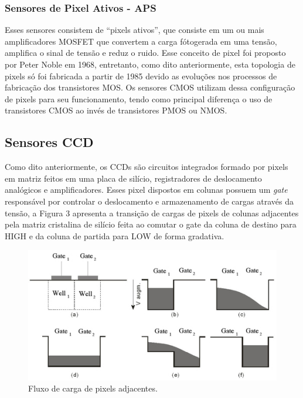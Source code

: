 \documentclass[10pt,a4paper,twocolumn]{article}
\begin{document}
	\subsubsection*{Sensores de Pixel Ativos - APS}
		Esses sensores consistem de ``pixels ativos'', que consiste em um ou mais amplificadores MOSFET que convertem a carga fótogerada em uma tensão, amplifica o sinal de tensão e reduz o ruido. Esse conceito de pixel foi proposto por Peter Noble em 1968, entretanto, como dito anteriormente, esta topologia de pixels só foi fabricada a partir de 1985 devido as evoluções nos processos de fabricação dos transistores MOS.  Os sensores CMOS utilizam dessa configuração de pixels para seu funcionamento, tendo como principal diferença o uso de transistores CMOS ao invés de transistores PMOS ou NMOS.
	
	\subsection*{Sensores CCD}
	Como dito anteriormente, os CCDs são circuitos integrados formado por pixels em matriz feitos em uma placa de silício, registradores de deslocamento analógicos e amplificadores. Esses pixel dispostos em colunas possuem um \textit{gate} responsável por controlar o deslocamento e armazenamento de cargas através da tensão, a Figura 3 apresenta a transição de cargas de pixels de colunas adjacentes pela matriz cristalina de silício feita ao comutar o gate da coluna de destino para HIGH e da coluna de partida para LOW de forma gradativa.
	
	\begin{figure}[!h]
		\centering
		\includegraphics[scale=0.45]{imagens/ccd.jpg}
		\caption{Fluxo de carga de pixels adjacentes.}
	\end{figure}
		
\end{document}
